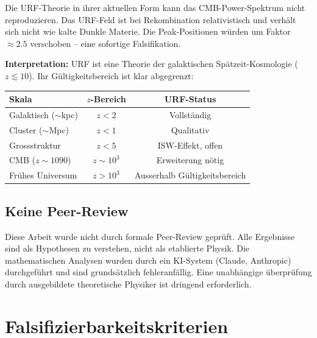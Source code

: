 \documentclass[12pt,a4paper]{article}
\theoremstyle{definition}
\begin{document}
Die URF-Theorie in ihrer aktuellen Form kann das CMB-Power-Spektrum
nicht reproduzieren. Das URF-Feld ist bei Rekombination relativistisch
und verhält sich nicht wie kalte Dunkle Materie. Die Peak-Positionen
würden um Faktor $\approx 2.5$ verschoben -- eine sofortige Falsifikation.

\textbf{Interpretation:} URF ist eine Theorie der galaktischen
Spätzeit-Kosmologie ($z \lesssim 10$). Ihr Gültigkeitsbereich ist
klar abgegrenzt:
\begin{center}
\begin{tabular}{lcc}
\toprule
Skala & $z$-Bereich & URF-Status \\
\midrule
Galaktisch ($\sim$kpc) & $z < 2$ & Vollständig \\
Cluster ($\sim$Mpc) & $z < 1$ & Qualitativ \\
Grossstruktur & $z < 5$ & ISW-Effekt, offen \\
CMB ($z \sim 1090$) & $z \sim 10^3$ & Erweiterung nötig \\
Frühes Universum & $z > 10^3$ & Ausserhalb Gültigkeitsbereich \\
\bottomrule
\end{tabular}
\end{center}

\subsection{Keine Peer-Review}

Diese Arbeit wurde nicht durch formale Peer-Review geprüft. Alle
Ergebnisse sind als Hypothesen zu verstehen, nicht als etablierte
Physik. Die mathematischen Analysen wurden durch ein KI-System
(Claude, Anthropic) durchgeführt und sind grundsätzlich fehleranfällig.
Eine unabhängige überprüfung durch ausgebildete theoretische Physiker
ist dringend erforderlich.

\section{Falsifizierbarkeitskriterien}
\label{sec:falsifikation}
\end{document}
